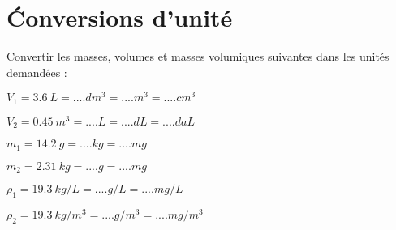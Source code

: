 \section{\'Conversions d'unité}\label{ex:convert}

Convertir les masses, volumes et masses volumiques suivantes dans les unités demandées :
\begin{questions}
	\begin{multicols}{2}
			
		\question $V_1 = \num{3.6}\  L = .... dm^3 = .... m^3 = ....cm^3 $
		
		\question $V_2 = \num{0.45}\  m^3 = .... L = .... dL = ....daL $
		
		\question $m_1 = \num{14.2}\  g = .... kg = .... mg $
		
		\question $m_2 = \num{2.31}\  kg = .... g = .... mg $
		
		\question $\rho _1 = \num{19.3}\  kg/L = .... g/L = .... mg/L $
		
		\question $\rho _2 = \num{19.3}\  kg/m^3 = .... g/m^3 = .... mg/m^3 $
	\end{multicols}
\end{questions}
